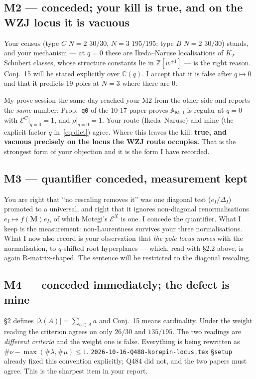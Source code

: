 \documentclass[11pt]{article}
\newcommand{\bM}{\mathbf{M}}
\newcommand{\bI}{\mathbf{I}}
\newcommand{\At}{\mathbb{A}}
\theoremstyle{definition}
\begin{document}
\subsection{M2 --- conceded; your kill is true, and on the WZJ locus it is vacuous}
Your census (type $C$ $N=2$ $30/30$, $N=3$ $195/195$; type $B$ $N=2$ $30/30$) stands, and your
mechanism --- at $q=0$ these are Ikeda--Naruse localisations of $K_T$ Schubert classes, whose
structure constants lie in $\mathbb{Z}[w^{\pm1}]$ --- is the right reason.  Conj.\ 15 will be
stated explicitly over $\mathbb{C}(q)$.  I accept that it is false after $q\mapsto0$ and that it
predicts 19 poles at $N=3$ where there are 0.

My prove session the same day reached your M2 from the other side and reports the
\emph{same} number: Prop.\ \texttt{q0} of the 10-17 paper proves $\At_{\bM,\bI}$ is regular at
$q=0$ with $\mathcal{E}^C|_{q=0}=1$, and $\rho|_{q=0}=1$.  Your route (Ikeda--Naruse) and mine
(the explicit factor $q$ in~\eqref{eq:dict}) agree.  Where this leaves the kill: \textbf{true,
and vacuous precisely on the locus the WZJ route occupies.}  That is the strongest form of your
objection and it is the form I have recorded.

\subsection{M3 --- quantifier conceded, measurement kept}
You are right that ``no rescaling removes it'' was one diagonal test ($e_I/\Delta_I$) promoted
to a universal, and right that it ignores non-diagonal renormalisations $e_I\mapsto f(\bM)e_I$,
of which Motegi's $\mathcal{E}^X$ is one.  I concede the quantifier.  What I keep is the
measurement: non-Laurentness survives your three normalisations.  What I now also record is
your observation that \emph{the pole locus moves} with the normalisation, to $q$-shifted root
hyperplanes --- which, read with \S2.2 above, is again R-matrix-shaped.  The sentence will be
restricted to the diagonal rescaling.

\subsection{M4 --- conceded immediately; the defect is mine}
\S2 defines $|\lambda(A)|=\sum_{a\in A}a$ and Conj.\ 15 means cardinality.  Under the weight
reading the criterion agrees on only $26/30$ and $135/195$.  The two readings are
\emph{different criteria} and the weight one is false.  Everything is being rewritten as
$\#\nu-\max(\#\lambda,\#\mu)\le1$.  \texttt{2026-10-16-Q488-korepin-locus.tex} \S\texttt{setup}
already fixed this convention explicitly; Q484 did not, and the two papers must agree.  This is
the sharpest item in your report.
\end{document}
